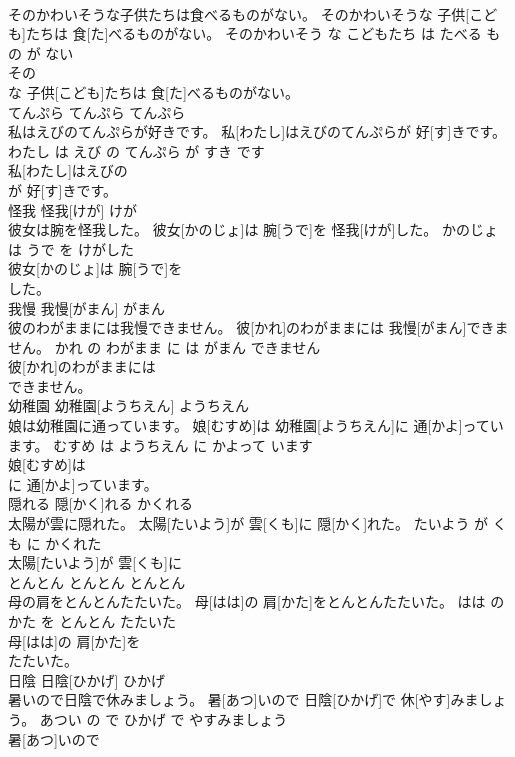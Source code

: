 \documentclass[8pt]{extreport}
\begin{document}
\begin{CJK}{UTF8}{min}
\\	そのかわいそうな子供たちは食べるものがない。	そのかわいそうな 子供[こども]たちは 食[た]べるものがない。	そのかわいそう な こどもたち は たべる もの が ない	
\\	その
\\	な 子供[こども]たちは 食[た]べるものがない。		
\\	てんぷら	てんぷら	てんぷら	
\\	私はえびのてんぷらが好きです。	私[わたし]はえびのてんぷらが 好[す]きです。	わたし は えび の てんぷら が すき です	
\\	私[わたし]はえびの
\\	が 好[す]きです。		
\\	怪我	怪我[けが]	けが	
\\	彼女は腕を怪我した。	彼女[かのじょ]は 腕[うで]を 怪我[けが]した。	かのじょ は うで を けがした	
\\	彼女[かのじょ]は 腕[うで]を
\\	した。		
\\	我慢	我慢[がまん]	がまん	
\\	彼のわがままには我慢できません。	彼[かれ]のわがままには 我慢[がまん]できません。	かれ の わがまま に は がまん できません	
\\	彼[かれ]のわがままには
\\	できません。		
\\	幼稚園	幼稚園[ようちえん]	ようちえん	
\\	娘は幼稚園に通っています。	娘[むすめ]は 幼稚園[ようちえん]に 通[かよ]っています。	むすめ は ようちえん に かよって います	
\\	娘[むすめ]は
\\	に 通[かよ]っています。		
\\	隠れる	隠[かく]れる	かくれる	
\\	太陽が雲に隠れた。	太陽[たいよう]が 雲[くも]に 隠[かく]れた。	たいよう が くも に かくれた	
\\	太陽[たいよう]が 雲[くも]に
\\	とんとん	とんとん	とんとん	
\\	母の肩をとんとんたたいた。	母[はは]の 肩[かた]をとんとんたたいた。	はは の かた を とんとん たたいた	
\\	母[はは]の 肩[かた]を
\\	たたいた。		
\\	日陰	日陰[ひかげ]	ひかげ	
\\	暑いので日陰で休みましょう。	暑[あつ]いので 日陰[ひかげ]で 休[やす]みましょう。	あつい の で ひかげ で やすみましょう	
\\	暑[あつ]いので

\end{CJK}
\end{document}
